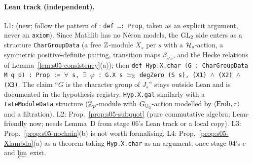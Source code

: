 \paragraph{Lean track (independent).}
L1:  (new; follow the pattern of : \texttt{def \dots : Prop}, taken as
an explicit argument, never an \texttt{axiom}). Since Mathlib has no Néron models, the $\mathrm{GL}_2$ side enters as a structure
\texttt{CharGroupData} (a free $\mathbb{Z}$-module $X_s$ per $s$ with a $\mathcal{H}_s$-action, a symmetric positive-definite pairing, transition
maps $\beta_{s's}$, and the Hecke relations of Lemma~\ref{lem:s05-consistency}(a)); then
\texttt{def Hyp.X.char (G : CharGroupData M q p) : Prop := $\forall$ s, $\exists$ $\varphi$ : G.X s $\simeq_{\mathbb{Z}}$ degZero (S s), (X1) $\wedge$ (X2) $\wedge$ (X3)}.
The claim ``$G$ is the character group of $J_s$'' stays outside Lean and is documented in the hypothesis registry.
\texttt{Hyp.X.gal} similarly with a \texttt{TateModuleData} structure ($\mathbb{Z}_p$-module with $G_{\mathbb{Q}_q}$-action modelled by
$\langle\mathrm{Frob},\tau\rangle$ and a filtration). L2: Prop.~\ref{prop:s05-subquot} (pure commutative algebra; Lean-friendly now;
needs Lemma~D from stage 06's Lean track or a local copy). L3: Prop.~\ref{prop:s05-nochain}(b) is not worth formalising. L4:
Prop.~\ref{prop:s05-Xlambda}(a) as a theorem taking \texttt{Hyp.X.char} as an argument, once stage 04's $e$ and $\varprojlim$ exist.

